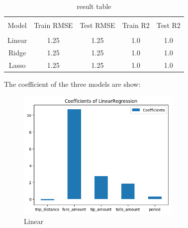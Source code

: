 \documentclass[11pt]{article}
\begin{document}
\begin{table}[h]
    \centering  
    \caption{result table}  
    \label{table1} 
    \begin{tabular}{|c|c|c|c|c|}  
        \hline  %
        & & & & \\[-6pt]  %
        Model&Train RMSE&Test RMSE&Train R2&Test R2 \\  %
        \hline
        & & & & \\[-6pt]  %
        Linear&1.25&1.25&1.0& 1.0 \\
        Ridge&1.25&1.25&1.0& 1.0 \\
        Lasso&1.25&1.25&1.0& 1.0 \\
        \hline
    \end{tabular}
\end{table}

The coefficient of the three models are show:

\begin{figure}[!h]
    \centering
    \includegraphics[width=0.7\textwidth]{plots/p11.png}
    \caption{Linear} %
    \label{fig:image4}
\end{figure}
\end{document}
